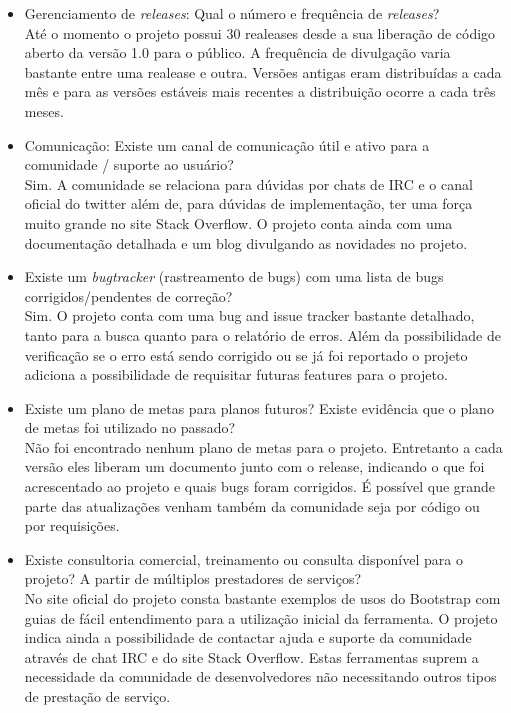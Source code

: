 \documentclass[12pt,a4paper]{article} %
\begin{document}
\begin{itemize}
\item Gerenciamento de \textit{releases}: Qual o número e frequência de \textit{releases}?\\
	Até o momento o projeto possui 30 realeases desde a sua liberação de código aberto da versão 1.0 para o público. A frequência de divulgação varia bastante entre uma realease e outra. Versões antigas eram distribuídas a cada mês e para as versões estáveis mais recentes a distribuição ocorre a cada três meses.
\item Comunicação: Existe um canal de comunicação útil e ativo para a comunidade / suporte ao usuário?\\
	Sim. A comunidade se relaciona para dúvidas por chats de IRC e o canal oficial do twitter além de, para dúvidas de implementação, ter uma força muito grande no site Stack Overflow. O projeto conta ainda com uma documentação detalhada e um blog divulgando as novidades no projeto.
\item Existe um \textit{bugtracker} (rastreamento de bugs) com uma lista de bugs corrigidos/pendentes de correção?\\
	Sim. O projeto conta com uma bug and issue tracker bastante detalhado, tanto para a busca quanto para o relatório de erros. Além da possibilidade de verificação se o erro está sendo corrigido ou se já foi reportado o projeto adiciona a possibilidade de requisitar futuras features para o projeto.
\item Existe um plano de metas para planos futuros? Existe evidência que o plano de metas foi utilizado no passado?\\
	Não foi encontrado nenhum plano de metas para o projeto. Entretanto a cada versão eles liberam um documento junto com o release, indicando o que foi acrescentado ao projeto e quais bugs foram corrigidos. É possível que grande parte das atualizações venham também da comunidade seja por código ou por requisições.
\item Existe consultoria comercial, treinamento ou consulta disponível para o projeto? A partir de múltiplos prestadores de serviços?   \\
	No site oficial do projeto consta bastante exemplos de usos do Bootstrap com guias de fácil entendimento para a utilização inicial da ferramenta. O projeto indica ainda a possibilidade de contactar ajuda e suporte da comunidade através de chat IRC e do site Stack Overflow. Estas ferramentas suprem a necessidade da comunidade de desenvolvedores não necessitando outros tipos de prestação de serviço.     
\end{itemize}
        

\par\vspace{\baselineskip}

\end{document}
